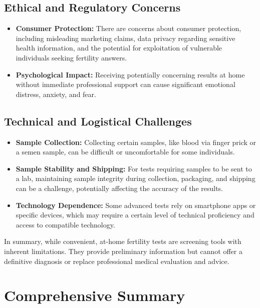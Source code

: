 \documentclass{article}
\begin{document}
\subsection{Ethical and Regulatory Concerns}
\begin{itemize}
    \textbf{Lack of Regulation:} The regulatory landscape for at-home medical tests can be less stringent than for clinical laboratory tests, particularly in some regions. This can lead to products of questionable quality entering the market.
    \item \textbf{Consumer Protection:} There are concerns about consumer protection, including misleading marketing claims, data privacy regarding sensitive health information, and the potential for exploitation of vulnerable individuals seeking fertility answers.
    \item \textbf{Psychological Impact:} Receiving potentially concerning results at home without immediate professional support can cause significant emotional distress, anxiety, and fear.
\end{itemize}

\subsection{Technical and Logistical Challenges}
\begin{itemize}
    \item \textbf{Sample Collection:} Collecting certain samples, like blood via finger prick or a semen sample, can be difficult or uncomfortable for some individuals.
    \item \textbf{Sample Stability and Shipping:} For tests requiring samples to be sent to a lab, maintaining sample integrity during collection, packaging, and shipping can be a challenge, potentially affecting the accuracy of the results.
    \item \textbf{Technology Dependence:} Some advanced tests rely on smartphone apps or specific devices, which may require a certain level of technical proficiency and access to compatible technology.
\end{itemize}

In summary, while convenient, at-home fertility tests are screening tools with inherent limitations. They provide preliminary information but cannot offer a definitive diagnosis or replace professional medical evaluation and advice.

\section{Comprehensive Summary}
\end{document}
